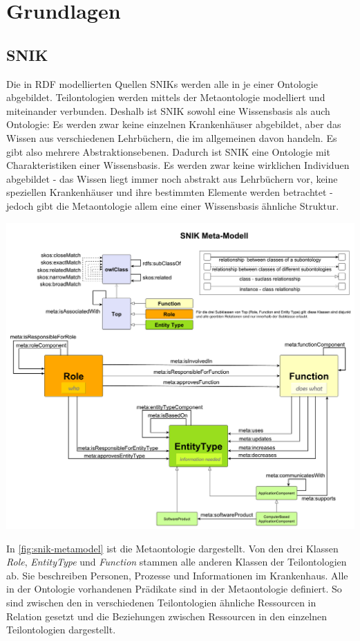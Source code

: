 \documentclass[utf8,biblatex]{lni}
\begin{document}
\section{Grundlagen}

\subsection{SNIK}

Die in RDF modellierten Quellen SNIKs werden alle in je einer Ontologie abgebildet.
Teilontologien werden mittels der Metaontologie modelliert und miteinander verbunden.
Deshalb ist SNIK sowohl eine Wissensbasis als auch Ontologie:
Es werden zwar keine einzelnen Krankenhäuser abgebildet, aber das Wissen aus verschiedenen Lehrbüchern, die im allgemeinen davon handeln.
Es gibt also mehrere Abstraktionsebenen.
Dadurch ist SNIK eine Ontologie mit Charakteristiken einer Wissensbasis.
Es werden zwar keine wirklichen Individuen abgebildet
- das Wissen liegt immer noch abstrakt aus Lehrbüchern vor, keine speziellen Krankenhäuser und ihre bestimmten Elemente werden betrachtet -
jedoch gibt die Metaontologie allem eine einer Wissensbasis ähnliche Struktur.

\includegraphics[width=\linewidth]{../Dokumentation/Images/snik-metamodel.pdf}\label{fig:snik-metamodel}

In \cref{fig:snik-metamodel} ist die Metaontologie dargestellt.
Von den drei Klassen \emph{Role}, \emph{EntityType} und \emph{Function} stammen alle anderen Klassen der Teilontologien ab.
Sie beschreiben Personen, Prozesse und Informationen im Krankenhaus.
Alle in der Ontologie vorhandenen Prädikate sind in der Metaontologie definiert.
So sind zwischen den in verschiedenen Teilontologien ähnliche Ressourcen in Relation gesetzt und die Beziehungen zwischen Ressourcen in den einzelnen Teilontologien dargestellt.
\end{document}
